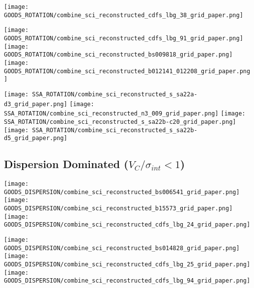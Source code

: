 \documentclass[fleqn,usenatbib]{mn2e}
\begin{document}
\begin{figure*}
\centering
\texttt{[image: GOODS\_ROTATION/combine\_sci\_reconstructed\_cdfs\_lbg\_38\_grid\_paper.png]}
\label{fig:goods_rot_2}
\end{figure*}


\begin{figure*}
\centering
\texttt{[image: GOODS\_ROTATION/combine\_sci\_reconstructed\_cdfs\_lbg\_91\_grid\_paper.png]}
\texttt{[image: GOODS\_ROTATION/combine\_sci\_reconstructed\_bs009818\_grid\_paper.png]}
\texttt{[image: GOODS\_ROTATION/combine\_sci\_reconstructed\_b012141\_012208\_grid\_paper.png]}
\label{fig:goods_rot_3}
\end{figure*}

\begin{figure*}
\centering
\texttt{[image: SSA\_ROTATION/combine\_sci\_reconstructed\_s\_sa22a-d3\_grid\_paper.png]}
\texttt{[image: SSA\_ROTATION/combine\_sci\_reconstructed\_n3\_009\_grid\_paper.png]}
\texttt{[image: SSA\_ROTATION/combine\_sci\_reconstructed\_s\_sa22b-c20\_grid\_paper.png]}
\texttt{[image: SSA\_ROTATION/combine\_sci\_reconstructed\_s\_sa22b-d5\_grid\_paper.png]}
\label{fig:SSA_rot_1}
\end{figure*}

\subsection{Dispersion Dominated ($V_{C}/\sigma_{int} < 1$)}\label{app:dispersion_dominated}

\begin{figure*}
\centering
\texttt{[image: GOODS\_DISPERSION/combine\_sci\_reconstructed\_bs006541\_grid\_paper.png]}
\texttt{[image: GOODS\_DISPERSION/combine\_sci\_reconstructed\_b15573\_grid\_paper.png]}
\texttt{[image: GOODS\_DISPERSION/combine\_sci\_reconstructed\_cdfs\_lbg\_24\_grid\_paper.png]}
\label{fig:goods_disp_1}
\end{figure*}

\begin{figure*}
\centering
\texttt{[image: GOODS\_DISPERSION/combine\_sci\_reconstructed\_bs014828\_grid\_paper.png]}
\texttt{[image: GOODS\_DISPERSION/combine\_sci\_reconstructed\_cdfs\_lbg\_25\_grid\_paper.png]}
\texttt{[image: GOODS\_DISPERSION/combine\_sci\_reconstructed\_cdfs\_lbg\_94\_grid\_paper.png]}
\label{fig:goods_disp_2}
\end{figure*}
\end{document}
